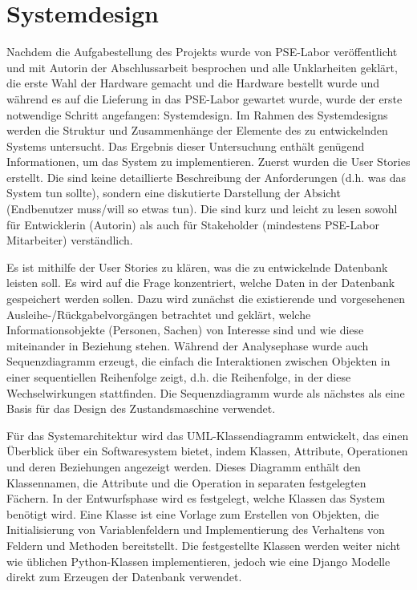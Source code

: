 \chapter{Systemdesign}
\label{sec:design}
Nachdem die Aufgabestellung des Projekts wurde von PSE-Labor veröffentlicht und mit Autorin der Abschlussarbeit besprochen und alle Unklarheiten geklärt, die erste Wahl der Hardware gemacht und die Hardware bestellt wurde und während es auf die Lieferung in das PSE-Labor gewartet wurde, wurde der erste notwendige Schritt angefangen: Systemdesign. Im Rahmen des Systemdesigns werden die Struktur und Zusammenhänge der Elemente des zu entwickelnden Systems untersucht. Das Ergebnis dieser Untersuchung enthält genügend Informationen, um das System zu implementieren. Zuerst wurden die User Stories erstellt. Die sind keine detaillierte Beschreibung der Anforderungen (d.h. was das System tun sollte), sondern eine diskutierte Darstellung der Absicht (Endbenutzer muss/will so etwas tun). Die sind kurz und leicht zu lesen sowohl für Entwicklerin (Autorin) als auch für Stakeholder (mindestens PSE-Labor Mitarbeiter) verständlich. 

Es ist mithilfe der User Stories zu klären, was die zu entwickelnde Datenbank leisten soll. Es wird auf die Frage konzentriert, welche Daten in der Datenbank gespeichert werden sollen. Dazu wird zunächst  die existierende und vorgesehenen Ausleihe-/Rückgabelvorgängen betrachtet und geklärt, welche Informationsobjekte (Personen, Sachen) von Interesse sind und wie diese miteinander in Beziehung stehen. Während der Analysephase wurde auch Sequenzdiagramm erzeugt, die einfach die Interaktionen zwischen Objekten in einer sequentiellen Reihenfolge zeigt, d.h. die Reihenfolge, in der diese Wechselwirkungen stattfinden. Die Sequenzdiagramm wurde als nächstes als eine Basis für das Design des Zustandsmaschine verwendet.  

Für das Systemarchitektur wird das UML-Klassendiagramm entwickelt, das einen Überblick über ein Softwaresystem bietet, indem Klassen, Attribute, Operationen und deren Beziehungen angezeigt werden. Dieses Diagramm enthält den Klassennamen, die Attribute und die Operation in separaten festgelegten Fächern. In der Entwurfsphase wird es festgelegt, welche Klassen das System benötigt wird. Eine Klasse ist eine Vorlage zum Erstellen von Objekten, die Initialisierung von Variablenfeldern und Implementierung des Verhaltens von Feldern und Methoden bereitstellt. Die festgestellte Klassen werden weiter nicht wie üblichen Python-Klassen implementieren, jedoch wie eine Django Modelle direkt zum Erzeugen der Datenbank verwendet. 

